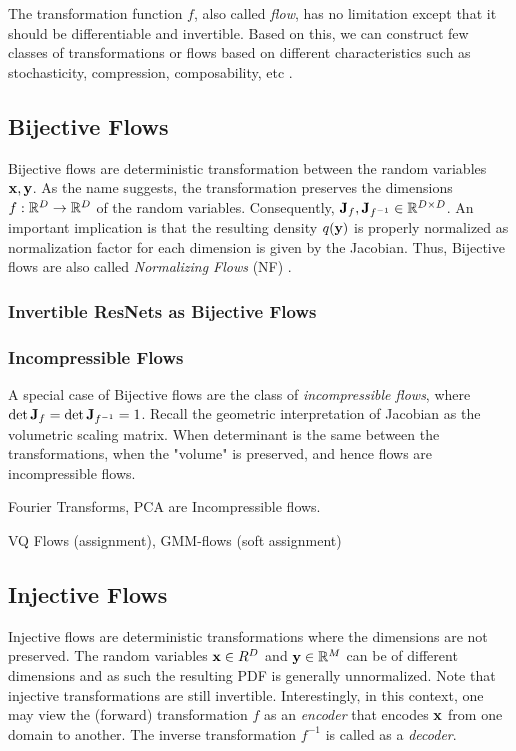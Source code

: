 \documentclass[a4paper, 11pt]{article}
\begin{document}
The transformation function $f$, also called \emph{flow}, has no limitation except that it should be differentiable and invertible. Based on this, we can construct few classes of transformations or flows based on different characteristics such as stochasticity, compression, composability, etc \citep{kothe2023review}.


\subsection{Bijective Flows}
Bijective flows are deterministic transformation between the random variables $\mbox{$\mbox{$\mathbf{x}$}$}, \mbox{$\mbox{$\mathbf{y}$}$}$. As the name suggests, the transformation preserves the dimensions $f: \mathbb{R}^D \to \mathbb{R}^D$ of the random variables. Consequently, $\mbox{$\mbox{$\mathbf{J}$}$}_{f}, \mbox{$\mbox{$\mathbf{J}$}$}_{f^{-1}} \in \mathbb{R}^{D \times D}$. An important implication is that the resulting density $q(\mbox{$\mbox{$\mathbf{y}$}$})$ is properly normalized as normalization factor for each dimension is given by the Jacobian. Thus, Bijective flows are also called \emph{Normalizing Flows} (NF) \citep{papamakarios2021normalizing}. 

\subsubsection{Invertible ResNets as Bijective Flows}


\subsubsection{Incompressible Flows}
A special case of Bijective flows are the class of \emph{incompressible flows}, where $\det \mbox{$\mbox{$\mathbf{J}$}$}_f = \det \mbox{$\mbox{$\mathbf{J}$}$}_{f^{-1}} = 1$. Recall the geometric interpretation of Jacobian as the volumetric scaling matrix. When determinant is the same between the transformations, when the "volume" is preserved, and hence flows are incompressible flows. 

Fourier Transforms, PCA are Incompressible flows. 

VQ Flows (assignment), GMM-flows (soft assignment)


\subsection{Injective Flows}
Injective flows are deterministic transformations where the dimensions are not preserved. The random variables $\mbox{$\mbox{$\mathbf{x}$}$} \in R^D$ and $\mbox{$\mbox{$\mathbf{y}$}$} \in \mathbb{R}^M$ can be of different dimensions and as such the resulting PDF is generally unnormalized. Note that injective transformations are still invertible. Interestingly, in this context, one may view the (forward) transformation $f$ as an \emph{encoder} that encodes $\mbox{$\mbox{$\mathbf{x}$}$}$ from one domain to another. The inverse transformation $f^{-1}$ is called as a \emph{decoder}.
\end{document}
